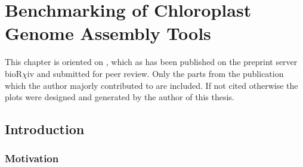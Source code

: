 \newcommand{\formatprogramnames}[1]{\texttt{#1}}
\newcommand{\ce}{\formatprogramnames{chloroExtractor}}
\newcommand{\oa}{\formatprogramnames{ORG.Asm}}
\newcommand{\fp}{\formatprogramnames{Fast-Plast}}
\newcommand{\ioga}{\formatprogramnames{IOGA}}
\newcommand{\np}{\formatprogramnames{NOVOPlasty}}
\newcommand{\go}{\formatprogramnames{GetOrganelle}}
\newcommand{\cassp}{\formatprogramnames{Chloroplast assembly protocol}}



\chapter{Benchmarking of Chloroplast Genome Assembly Tools } %

\label{Chapter1} %
This chapter is oriented on \cite{freudenthal2019landscape}, which as
has been published on the preprint server bioR$\chi$iv and submitted
for peer review. Only the parts from the publication which the
author majorly contributed to are included. If not cited otherwise the
plots were designed and generated by the author of this thesis.


\newcommand{\keyword}[1]{\textbf{#1}}
\newcommand{\tabhead}[1]{\textbf{#1}}
\newcommand{\code}[1]{\texttt{#1}}
\newcommand{\file}[1]{\texttt{\bfseries#1}}
\newcommand{\option}[1]{\texttt{\itshape#1}}


\section{Introduction} \label{intro:cp}
\subsection{Motivation}

